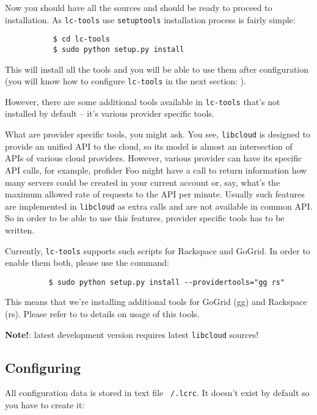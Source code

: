 \documentclass[a4paper]{report}
\begin{document}
          Now you should have all the sources and should be ready to proceed to
          installation. As {\tt lc-tools} use {\tt setuptools} installation
          process is fairly simple:

          \begin{verbatim}
           $ cd lc-tools
           $ sudo python setup.py install
           \end{verbatim}

         This will install all the tools and you will be able to use them
         after configuration (you will know how to configure {\tt lc-tools}
         in the next section: ).

         However, there are some additional tools available in {\tt lc-tools}
         that's not installed by default -- it's various provider specific tools.

         What are provider specific tools, you might ask. You see, {\tt libcloud}
         is designed to provide an unified API to the cloud, so its model is almost
         an intersection of APIs of various cloud providers. However, various
         provider can have its specific API calls, for example, profider Foo might
         have a call to return information how many servers could be created in
         your current account or, say, what's the maximum allowed rate of requests
         to the API per minute. Usually such features are implemented in {\tt libcloud}
         as extra calls and are not available in common API. So in order to be able
         to use this features, provider specific tools has to be written.

         Currently, {\tt lc-tools} supports such scripts for Rackspace and GoGrid.
         In order to enable them both, please use the command:

         \begin{verbatim}
          $ sudo python setup.py install --providertools="gg rs"
          \end{verbatim}

         This means that we're installing additional tools for GoGrid (gg) and
         Rackspace (rs). Please refer to  to details on usage
         of this tools.


         \textbf{Note!}: latest development version requires latest {\tt libcloud}
         sources!
      \subsection{Configuring} \label{conf}
      All configuration data is stored in text file {\tt ~/.lcrc}. It doesn't exist
      by default so you have to create it:
\end{document}
